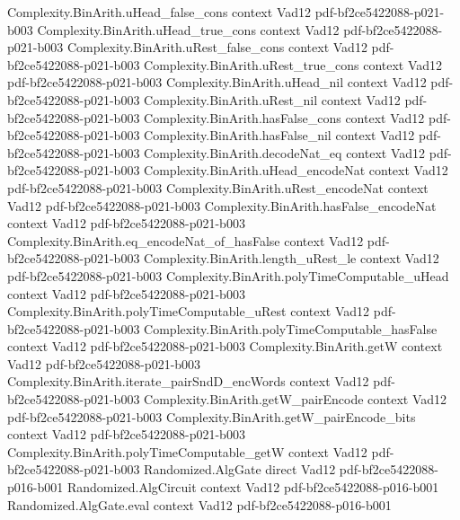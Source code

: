 \begin{theorem}
\proofstep
  {Complexity.BinArith.uHead_false_cons}
  {context}
  {Vad12}
  {pdf-bf2ce5422088-p021-b003}
\proofstep
  {Complexity.BinArith.uHead_true_cons}
  {context}
  {Vad12}
  {pdf-bf2ce5422088-p021-b003}
\proofstep
  {Complexity.BinArith.uRest_false_cons}
  {context}
  {Vad12}
  {pdf-bf2ce5422088-p021-b003}
\proofstep
  {Complexity.BinArith.uRest_true_cons}
  {context}
  {Vad12}
  {pdf-bf2ce5422088-p021-b003}
\proofstep
  {Complexity.BinArith.uHead_nil}
  {context}
  {Vad12}
  {pdf-bf2ce5422088-p021-b003}
\proofstep
  {Complexity.BinArith.uRest_nil}
  {context}
  {Vad12}
  {pdf-bf2ce5422088-p021-b003}
\proofstep
  {Complexity.BinArith.hasFalse_cons}
  {context}
  {Vad12}
  {pdf-bf2ce5422088-p021-b003}
\proofstep
  {Complexity.BinArith.hasFalse_nil}
  {context}
  {Vad12}
  {pdf-bf2ce5422088-p021-b003}
\proofstep
  {Complexity.BinArith.decodeNat_eq}
  {context}
  {Vad12}
  {pdf-bf2ce5422088-p021-b003}
\proofstep
  {Complexity.BinArith.uHead_encodeNat}
  {context}
  {Vad12}
  {pdf-bf2ce5422088-p021-b003}
\proofstep
  {Complexity.BinArith.uRest_encodeNat}
  {context}
  {Vad12}
  {pdf-bf2ce5422088-p021-b003}
\proofstep
  {Complexity.BinArith.hasFalse_encodeNat}
  {context}
  {Vad12}
  {pdf-bf2ce5422088-p021-b003}
\proofstep
  {Complexity.BinArith.eq_encodeNat_of_hasFalse}
  {context}
  {Vad12}
  {pdf-bf2ce5422088-p021-b003}
\proofstep
  {Complexity.BinArith.length_uRest_le}
  {context}
  {Vad12}
  {pdf-bf2ce5422088-p021-b003}
\proofstep
  {Complexity.BinArith.polyTimeComputable_uHead}
  {context}
  {Vad12}
  {pdf-bf2ce5422088-p021-b003}
\proofstep
  {Complexity.BinArith.polyTimeComputable_uRest}
  {context}
  {Vad12}
  {pdf-bf2ce5422088-p021-b003}
\proofstep
  {Complexity.BinArith.polyTimeComputable_hasFalse}
  {context}
  {Vad12}
  {pdf-bf2ce5422088-p021-b003}
\proofstep
  {Complexity.BinArith.getW}
  {context}
  {Vad12}
  {pdf-bf2ce5422088-p021-b003}
\proofstep
  {Complexity.BinArith.iterate_pairSndD_encWords}
  {context}
  {Vad12}
  {pdf-bf2ce5422088-p021-b003}
\proofstep
  {Complexity.BinArith.getW_pairEncode}
  {context}
  {Vad12}
  {pdf-bf2ce5422088-p021-b003}
\proofstep
  {Complexity.BinArith.getW_pairEncode_bits}
  {context}
  {Vad12}
  {pdf-bf2ce5422088-p021-b003}
\proofstep
  {Complexity.BinArith.polyTimeComputable_getW}
  {context}
  {Vad12}
  {pdf-bf2ce5422088-p021-b003}
\proofstep
  {Randomized.AlgGate}
  {direct}
  {Vad12}
  {pdf-bf2ce5422088-p016-b001}
\proofstep
  {Randomized.AlgCircuit}
  {context}
  {Vad12}
  {pdf-bf2ce5422088-p016-b001}
\proofstep
  {Randomized.AlgGate.eval}
  {context}
  {Vad12}
  {pdf-bf2ce5422088-p016-b001}
\proofstep

\end{theorem}
